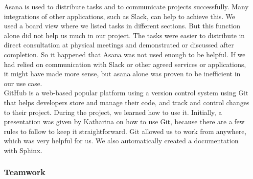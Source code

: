 Asana is used to distribute tasks and to communicate projects successfully. Many integrations of other applications, such as Slack, can help to achieve this. We used a board view where we listed tasks in different sections. But this function alone did not help us much in our project. The tasks were easier to distribute in direct consultation at physical meetings and demonstrated or discussed after completion. So it happened that Asana was not used enough to be helpful. If we had relied on communication with Slack or other agreed services or applications, it might have made more sense, but asana alone was proven to be inefficient in our use case. \\
GitHub is a web-based popular platform using a version control system using Git that helps developers store and manage their code, and track and control changes to their project. During the project, we learned how to use it. Initially, a presentation was given by Katharina on how to use Git, because there are a few rules to follow to keep it straightforward. Git allowed us to work from anywhere, which was very helpful for us. We also automatically created a documentation with Sphinx.


\subsubsection{Teamwork}

